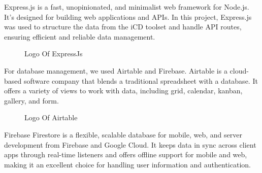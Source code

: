 Express.js is a fast, unopinionated, and minimalist web framework for Node.js. It's designed for building web applications and APIs. In this project, Express.js was used to structure the data from the iCD toolset and handle API routes, ensuring efficient and reliable data management.

\begin{figure}[H]
    \centering
    \caption{  Logo Of ExpressJs }
    \label{fig: ExpressJS_Logo}
\end{figure}

\newpage
For database management, we used  {\color{purple}Airtable} and  {\color{purple}Firebase}. Airtable is a cloud-based software company that blends a traditional spreadsheet with a database. It offers a variety of views to work with data, including grid, calendar, kanban, gallery, and form. 

\begin{figure}[H]
    \centering
    \caption{  Logo Of Airtable }
    \label{fig: Airtable_Logo}
\end{figure}

Firebase Firestore is a flexible, scalable database for mobile, web, and server development from Firebase and Google Cloud. It keeps data in sync across client apps through real-time listeners and offers offline support for mobile and web, making it an excellent choice for handling user information and authentication.

